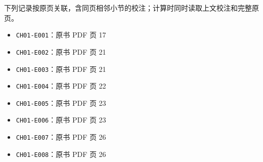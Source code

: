 \documentclass[
  10pt,
  fontset=fandol]{ctexart}
\providecommand{\tightlist}{%
  \setlength{\itemsep}{0pt}\setlength{\parskip}{0pt}}
\begin{document}
下列记录按原页关联，含同页相邻小节的校注；计算时同时读取上文校注和完整原页。

\begin{itemize}
\tightlist
\item
  \texttt{CH01-E001}：原书 PDF 页 17
\item
  \texttt{CH01-E002}：原书 PDF 页 21
\item
  \texttt{CH01-E003}：原书 PDF 页 21
\item
  \texttt{CH01-E004}：原书 PDF 页 22
\item
  \texttt{CH01-E005}：原书 PDF 页 23
\item
  \texttt{CH01-E006}：原书 PDF 页 23
\item
  \texttt{CH01-E007}：原书 PDF 页 26
\item
  \texttt{CH01-E008}：原书 PDF 页 26
\end{itemize}
\end{document}

